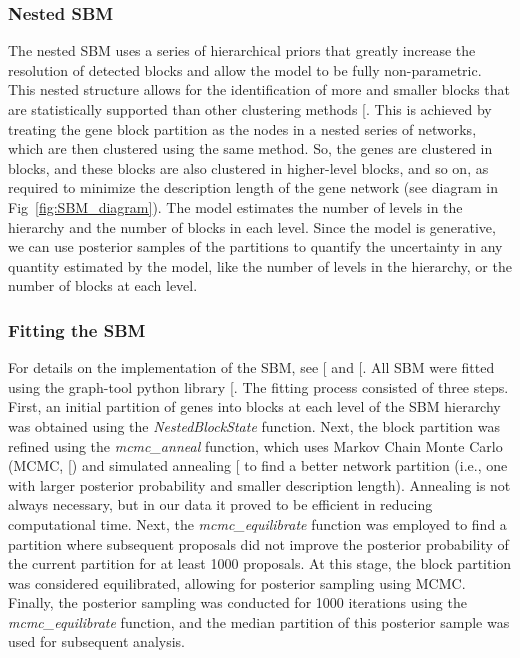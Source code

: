 \documentclass[
]{article}
\begin{document}
\subsubsection{Nested SBM}\label{nested-sbm}

The nested SBM uses a series of hierarchical priors that greatly
increase the resolution of detected blocks and allow the model to be
fully non-parametric. This nested structure allows for the
identification of more and smaller blocks that are statistically
supported than other clustering methods
{[}\citeproc{ref-Peixoto2017-zw}{15}{]}. This is achieved by treating
the gene block partition as the nodes in a nested series of networks,
which are then clustered using the same method. So, the genes are
clustered in blocks, and these blocks are also clustered in higher-level
blocks, and so on, as required to minimize the description length of the
gene network (see diagram in Fig~\ref{fig:SBM_diagram}). The model
estimates the number of levels in the hierarchy and the number of blocks
in each level. Since the model is generative, we can use posterior
samples of the partitions to quantify the uncertainty in any quantity
estimated by the model, like the number of levels in the hierarchy, or
the number of blocks at each level.

\subsubsection{Fitting the SBM}\label{fitting-the-sbm}

For details on the implementation of the SBM, see
{[}\citeproc{ref-Peixoto2017-zw}{15}{]} and
{[}\citeproc{ref-Peixoto2018-or}{14}{]}. All SBM were fitted using the
graph-tool python library
{[}\citeproc{ref-peixoto_graph-tool_2014}{26}{]}. The fitting process
consisted of three steps. First, an initial partition of genes into
blocks at each level of the SBM hierarchy was obtained using the
\emph{NestedBlockState} function. Next, the block partition was refined
using the \emph{mcmc\_anneal} function, which uses Markov Chain Monte
Carlo (MCMC, {[}\citeproc{ref-Peixoto2017-zw}{15}{]}) and simulated
annealing {[}\citeproc{ref-Kirkpatrick1983-ad}{27}{]} to find a better
network partition (i.e., one with larger posterior probability and
smaller description length). Annealing is not always necessary, but in
our data it proved to be efficient in reducing computational time. Next,
the \emph{mcmc\_equilibrate} function was employed to find a partition
where subsequent proposals did not improve the posterior probability of
the current partition for at least 1000 proposals. At this stage, the
block partition was considered equilibrated, allowing for posterior
sampling using MCMC. Finally, the posterior sampling was conducted for
1000 iterations using the \emph{mcmc\_equilibrate} function, and the
median partition of this posterior sample was used for subsequent
analysis.
\end{document}
